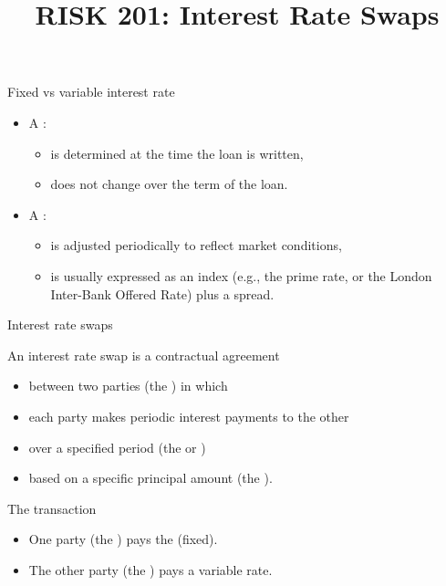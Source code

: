\documentclass{beamer}
\title{RISK 201: Interest Rate Swaps}
\begin{document}
\maketitle

\begin{frame}{Fixed vs variable interest rate}

\begin{itemize}
\item A :
  \begin{itemize}
  \item is determined at the time the loan is written,
  \item does not change over the term of the loan.
  \end{itemize}
\medskip
\item A :
  \begin{itemize}
  \item is adjusted periodically to reflect market conditions,
  \item is usually expressed as an index (e.g., the prime rate, or the London Inter-Bank Offered Rate) plus a spread.
  \end{itemize}
\end{itemize}

\end{frame}

\begin{frame}{Interest rate swaps}

An interest rate swap is a contractual agreement
\begin{itemize}
\item between two parties (the ) in which
\item each party makes periodic interest payments to the other
\item over a specified period (the  or )
\item based on a specific principal amount (the ).
\end{itemize}

\end{frame}

\begin{frame}{The transaction}

\begin{itemize}
\item One party (the ) pays the  (fixed).
\item The other party (the ) pays a variable rate.
\end{itemize}

\vfill
\end{frame}
\end{document}
